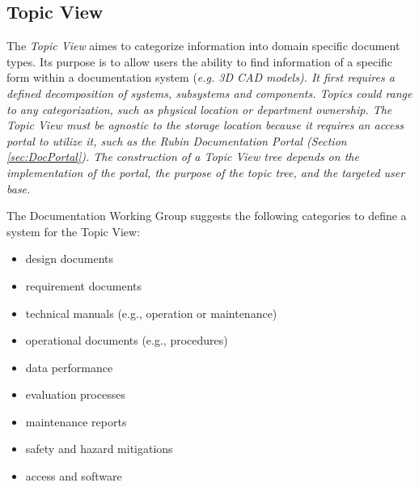 \subsection{Topic View}

The \emph{Topic View} aimes to categorize information into domain specific document types.
Its purpose is to allow users the ability to find information of a specific form within a documentation system (\it{e.g.} 3D CAD models).
It first requires a defined decomposition of systems, subsystems and components.
Topics could range to any categorization, such as physical location or department ownership.
The Topic View must be agnostic to the storage location because it requires an access portal to utilize it, such as the Rubin Documentation Portal (Section \ref{sec:DocPortal}).
The construction of a Topic View tree depends on the implementation of the portal, the purpose of the topic tree, and the targeted user base.

The Documentation Working Group suggests the following categories to define a system for the Topic View:

\begin{itemize}
\item design documents
\item requirement documents
\item technical manuals (e.g., operation or maintenance)
\item operational documents (e.g., procedures)
\item data performance
\item evaluation processes
\item maintenance reports
\item safety and hazard mitigations
\item access and software
\end{itemize}
